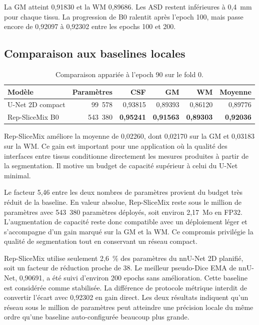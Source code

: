\documentclass[11pt,a4paper]{article}
\begin{document}
La GM atteint 0,91830 et la WM 0,89686. Les ASD restent inférieures à 0,4~mm
pour chaque tissu. La progression de B0 ralentit
après l'epoch 100, mais passe encore de 0,92097 à 0,92302 entre les epochs 100
et 200.

\subsection{Comparaison aux baselines locales}

\begin{table}[htbp]
\centering
\small
\caption{Comparaison appariée à l'epoch 90 sur le fold 0.}
\label{tab:compact-comparison}
\begin{tabular}{@{}lrrrrr@{}}
\toprule
Modèle & Paramètres & CSF & GM & WM & Moyenne \\
\midrule
U-Net 2D compact & 99~578 & 0,93815 & 0,89393 & 0,86120 & 0,89776 \\
Rep-SliceMix B0 & 543~380 & \textbf{0,95241} & \textbf{0,91563} & \textbf{0,89303} & \textbf{0,92036} \\
\bottomrule
\end{tabular}
\end{table}

Rep-SliceMix améliore la moyenne de 0,02260, dont 0,02170 sur la GM et 0,03183
sur la WM. Ce gain est important pour une application où la qualité des
interfaces entre tissus conditionne directement les mesures produites à partir
de la segmentation. Il motive un budget de capacité supérieur à celui du U-Net
minimal.

Le facteur 5,46 entre les deux nombres de paramètres provient du budget très
réduit de la baseline. En valeur absolue, Rep-SliceMix reste sous le million de
paramètres avec 543~380 paramètres déployés, soit environ 2,17~Mo en FP32.
L'augmentation de capacité reste donc compatible avec un déploiement léger et
s'accompagne d'un gain marqué sur la GM et la WM. Ce compromis privilégie la
qualité de segmentation tout en conservant un réseau compact.

Rep-SliceMix utilise seulement 2,6~\% des paramètres du nnU-Net 2D planifié, soit
un facteur de réduction proche de 38. Le meilleur pseudo-Dice EMA de nnU-Net,
0,90691, a été suivi d'environ 200 epochs sans amélioration. Cette baseline est
considérée comme stabilisée. La différence de protocole métrique interdit de
convertir l'écart avec 0,92302 en gain direct. Les deux résultats indiquent
qu'un réseau sous le million de paramètres peut atteindre une précision locale
du même ordre qu'une baseline auto-configurée beaucoup plus grande.
\end{document}
